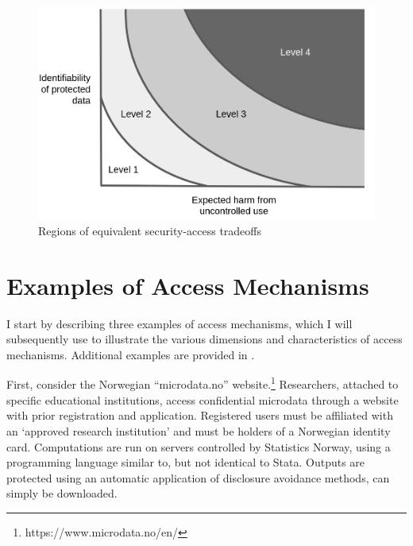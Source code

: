 \begin{figure}
    \centering
    \includegraphics[width=\textwidth]{altman-2015-mod.png}
    \caption{Regions of equivalent security-access tradeoffs}
    \label{fig:altman-2015-mod}
\end{figure}


\section{Examples of Access Mechanisms}

I start by describing three examples of access mechanisms, which I will subsequently use to illustrate the various dimensions and characteristics of access mechanisms. Additional examples are provided in \cite{shen_physically_2021}.

First, consider the Norwegian ``microdata.no'' website.\footnote{{https://www.microdata.no/en/}} Researchers, attached to specific educational institutions, access confidential microdata through a website with prior registration and application. Registered users must be affiliated with an `approved research institution' and must be holders of a Norwegian identity card. Computations are run on servers controlled by Statistics Norway, using a programming language similar to, but not identical to Stata. Outputs are protected using an automatic application of disclosure avoidance methods,  can simply be downloaded. 


